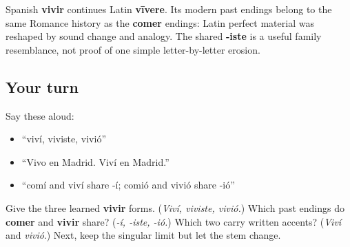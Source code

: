 \begin{cousinweb}
Spanish \textbf{vivir} continues Latin \textbf{vīvere}. Its modern past endings belong to the same Romance history as the \textbf{comer} endings: Latin perfect material was reshaped by sound change and analogy. The shared \textbf{-iste} is a useful family resemblance, not proof of one simple letter-by-letter erosion.
\end{cousinweb}

\subsection*{Your turn}
Say these aloud:

\begin{itemize}
\raggedright
  \item “viví, viviste, vivió”
  \item “Vivo en Madrid. Viví en Madrid.”
  \item “comí and viví share -í; comió and vivió share -ió”
\end{itemize}

\begin{tcolorbox}[breakable,colback=teal!4,colframe=teal!35!black,title={Before you move on}]
Give the three learned \textbf{vivir} forms. (\emph{Viví, viviste, vivió.}) Which past endings do \textbf{comer} and \textbf{vivir} share? (\emph{-í, -iste, -ió.}) Which two carry written accents? (\emph{Viví} and \emph{vivió}.) Next, keep the singular limit but let the stem change.
\end{tcolorbox}
